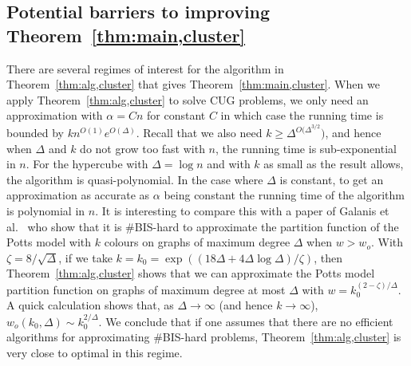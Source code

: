 \subsection{Potential barriers to improving Theorem~\ref{thm:main,cluster}}\label{sec:barrers,cluster}
%
There are several regimes of interest for the algorithm in Theorem~\ref{thm:alg,cluster} that gives Theorem~\ref{thm:main,cluster}.
When we apply Theorem~\ref{thm:alg,cluster} to solve CUG problems, we only need an approximation with $\alpha = Cn$ for constant $C$ in which case the running time is bounded by $kn^{O(1)}e^{O(\Delta)}$. 
Recall that we also need $k\ge \Delta^{O(\Delta^{3/2}})$, and hence when $\Delta$ and $k$ do not grow too fast with $n$, the running time is sub-exponential in $n$. 
For the hypercube with $\Delta=\log n$ and with $k$ as small as the result allows, the algorithm is quasi-polynomial.
In the case where $\Delta$ is constant, to get an approximation as accurate as $\alpha$ being constant the running time of the algorithm is polynomial in $n$.
It is interesting to compare this with a paper of Galanis et al.~\cite{GSVY16} who show that it is \#BIS-hard to approximate the partition function of the Potts model with $k$ colours on graphs of maximum degree $\Delta$ when $w>w_o$. 
With $\zeta=8/\sqrt\Delta$, if we take $k=k_0=\exp((18\Delta+4\Delta\log\Delta)/\zeta)$, then Theorem~\ref{thm:alg,cluster} shows that we can approximate the Potts model partition function on graphs of maximum degree at most $\Delta$ with $w=k_0^{(2-\zeta)/\Delta}$. 
A quick calculation shows that, as $\Delta\to \infty$ (and hence $k\to\infty$), $w_o(k_0,\Delta)\sim k_0^{2/\Delta}$. 
We conclude that if one assumes that there are no efficient algorithms for approximating \#BIS-hard problems, Theorem~\ref{thm:alg,cluster} is very close to optimal in this regime.
%
%
